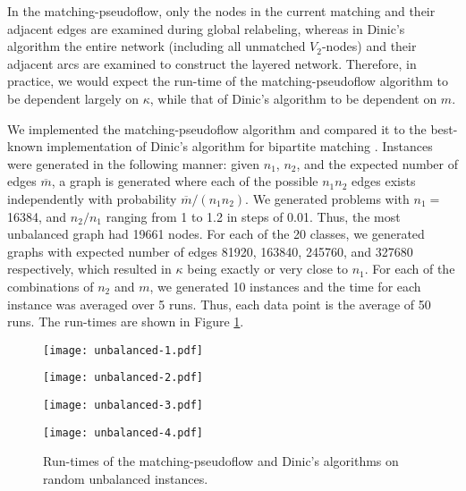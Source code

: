 \documentclass{article}
\begin{document}
In the {\sf matching-pseudoflow}, only the nodes in the current
matching and their adjacent edges are examined during global
relabeling, whereas in Dinic's algorithm the entire network (including
all unmatched $V_2$-nodes) and their adjacent arcs are examined to
construct the layered network. Therefore, in practice, we would expect
the run-time of the {\sf matching-pseudoflow} algorithm to be dependent
largely on $\kappa$, while that of Dinic's algorithm to be dependent on
$m$.

We implemented the {\sf matching-pseudoflow} algorithm and compared it to the best-known implementation of Dinic's algorithm for bipartite matching \cite{Set93}.  Instances were generated in the following manner: given $n_1$, $n_2$, and the expected number of edges $\overline{m}$,  a graph is generated where each of the possible $n_1 n_2$ edges exists independently with probability $\overline{m}/(n_1 n_2)$.  We generated problems with $n_1=$ 16384, and $n_2/n_1$ ranging from 1 to 1.2 in steps of 0.01.  Thus, the most unbalanced graph had 19661 nodes.  For each of the 20 classes, we generated graphs with expected number of edges 81920, 163840, 245760, and 327680 respectively, which resulted in $\kappa$ being exactly or very close to $n_1$.  For each of the combinations of $n_2$ and $m$, we generated 10 instances and the time for each instance was averaged over 5 runs. Thus, each data point is the average of 50 runs.  The run-times are shown in Figure \ref{fig:unbalanced}.

\begin{figure}[ht]
\begin{minipage}{0.49\linewidth}
\begin{center}
\centerline{\texttt{[image: unbalanced-1.pdf]}}
\centerline{\texttt{[image: unbalanced-2.pdf]}}
\end{center}
\end{minipage}\hfill
\begin{minipage}{0.49\linewidth}
\begin{center}
\centerline{\texttt{[image: unbalanced-3.pdf]}}
\centerline{\texttt{[image: unbalanced-4.pdf]}}
\end{center}
\end{minipage}
\caption{\label{fig:unbalanced} Run-times of the {\sf matching-pseudoflow} and Dinic's algorithms on random unbalanced instances.}
\end{figure}
\end{document}
